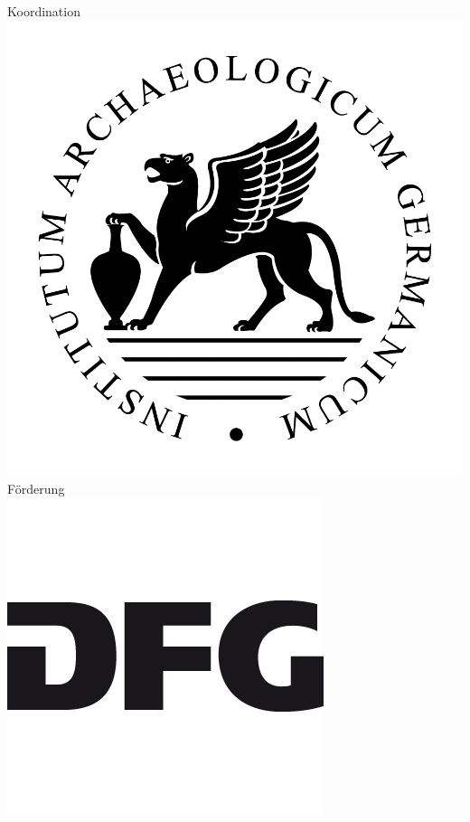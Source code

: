 \begin{titlepage}
\vfill
\begin{flushright} \sffamily
{}
Koordination\\
\includegraphics[width=\textwidth]{../deckblattLogos/dai.jpg} 
\endminipage
\hspace{1cm}
Förderung\\
\includegraphics[width=\textwidth]{../deckblattLogos/dfg.jpg}
\endminipage

\end{flushright}
\end{titlepage}